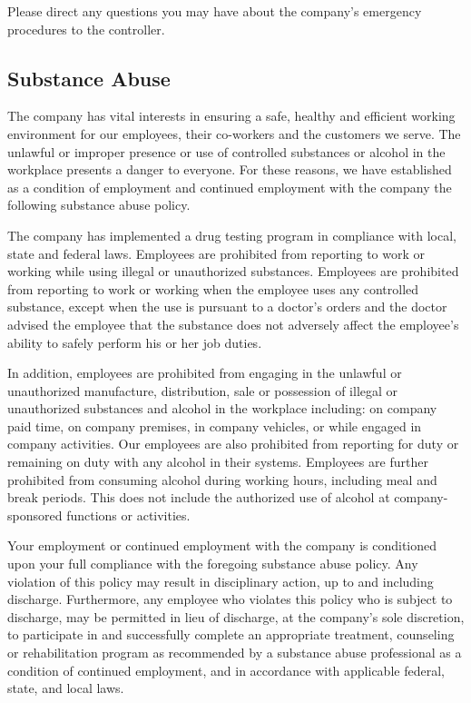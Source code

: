 Please direct any questions you may have about the company's emergency procedures to the controller.
	
\subsection{Substance Abuse}

The company has vital interests in ensuring a safe, healthy and efficient working environment for our employees, their co-workers and the customers we serve. The unlawful or improper presence or use of controlled substances or alcohol in the workplace presents a danger to everyone. For these reasons, we have established as a condition of employment and continued employment with the company the following substance abuse policy.

The company has implemented a drug testing program in compliance with local, state and federal laws. Employees are prohibited from reporting to work or working while using illegal or unauthorized substances. Employees are prohibited from reporting to work or working when the employee uses any controlled substance, except when the use is pursuant to a doctor's orders and the doctor advised the employee that the substance does not adversely affect the employee's ability to safely perform his or her job duties.

In addition, employees are prohibited from engaging in the unlawful or unauthorized manufacture, distribution, sale or possession of illegal or unauthorized substances and alcohol in the workplace including: on company paid time, on company premises, in company vehicles, or while engaged in company activities. Our employees are also prohibited from reporting for duty or remaining on duty with any alcohol in their systems. Employees are further prohibited from consuming alcohol during working hours, including meal and break periods. This does not include the authorized use of alcohol at company-sponsored functions or activities.
	
Your employment or continued employment with the company is conditioned upon your full compliance with the foregoing substance abuse policy. Any violation of this policy may result in disciplinary action, up to and including discharge. Furthermore, any employee who violates this policy who is subject to discharge, may be permitted in lieu of discharge, at the company's sole discretion, to participate in and successfully complete an appropriate treatment, counseling or rehabilitation program as recommended by a substance abuse	 professional as a condition of continued employment,	 and in accordance with applicable federal, state, and local laws.

